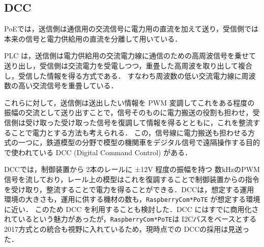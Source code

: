 \subsection{DCC}



PoEでは，送信側は通信用の交流信号に電力用の直流を加えて送り，受信側では本来の信号と電力供給用の直流を分離して用いている．

PLC は，送信側は電力供給用の交流電力線に通信のための高周波信号を乗せて送り出し，受信側は交流電力を受電しつつ，重畳した高周波を取り出して複合し，受信した情報を得る方式である．
すなわち周波数の低い交流電力線に周波数の高い交流信号を重畳している．

これらに対して，送信側は送出したい情報を PWM 変調してこれをある程度の振幅の交流として送り出すことで，信号そのものに電力搬送の役割も担わせ，受信側は受け取った受け取った信号を復調して情報を得るとともに，これを整流することで電力とする方法も考えられる．
この，信号線に電力搬送も担わせる方式の一つに，鉄道模型の分野で模型の機関車をデジタル信号で遠隔操作する目的で使われている DCC (Digital Command Control) がある\cite{misc:DCC}．

DCCでは，制御装置から 2本のレールに ±12V 程度の振幅を持つ 数kHzのPWM信号を流しており，レール上の模型はこれを復調することで制御装置からの指令を受け取り，整流することで電力を得ることができる．DCCは，想定する運用環境の大きさも，運用に供する機材の数も，{\tt Raspberry\-Com*PoTE} が想定する環境に近い．
このため DCC を利用することも検討した．DCC にはすでに商用化されているという魅力があったが，{\tt Raspberry\-Com*PoTE}は I2Cバスをベースとする2017方式との統合も視野に入れているため，現時点での DCCの採用は見送った．




